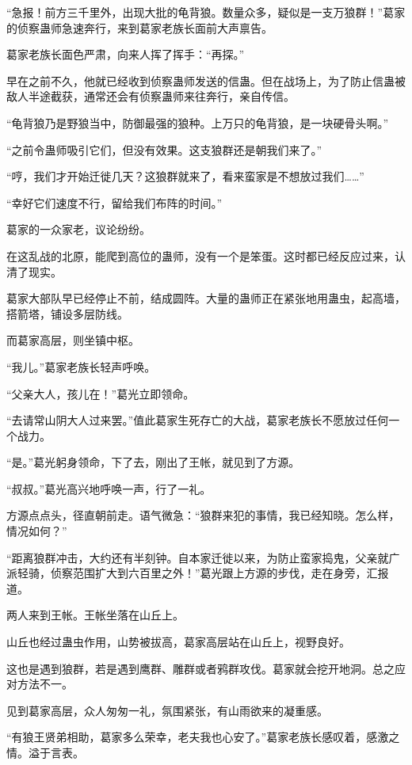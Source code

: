 
\begin{this_body}

“急报！前方三千里外，出现大批的龟背狼。数量众多，疑似是一支万狼群！”葛家的侦察蛊师急速奔行，来到葛家老族长面前大声禀告。

葛家老族长面色严肃，向来人挥了挥手：“再探。”

早在之前不久，他就已经收到侦察蛊师发送的信蛊。但在战场上，为了防止信蛊被敌人半途截获，通常还会有侦察蛊师来往奔行，亲自传信。

“龟背狼乃是野狼当中，防御最强的狼种。上万只的龟背狼，是一块硬骨头啊。”

“之前令蛊师吸引它们，但没有效果。这支狼群还是朝我们来了。”

“哼，我们才开始迁徙几天？这狼群就来了，看来蛮家是不想放过我们……”

“幸好它们速度不行，留给我们布阵的时间。”

葛家的一众家老，议论纷纷。

在这乱战的北原，能爬到高位的蛊师，没有一个是笨蛋。这时都已经反应过来，认清了现实。

葛家大部队早已经停止不前，结成圆阵。大量的蛊师正在紧张地用蛊虫，起高墙，搭箭塔，铺设多层防线。

而葛家高层，则坐镇中枢。

“我儿。”葛家老族长轻声呼唤。

“父亲大人，孩儿在！”葛光立即领命。

“去请常山阴大人过来罢。”值此葛家生死存亡的大战，葛家老族长不愿放过任何一个战力。

“是。”葛光躬身领命，下了去，刚出了王帐，就见到了方源。

“叔叔。”葛光高兴地呼唤一声，行了一礼。

方源点点头，径直朝前走。语气微急：“狼群来犯的事情，我已经知晓。怎么样，情况如何？”

“距离狼群冲击，大约还有半刻钟。自本家迁徙以来，为防止蛮家捣鬼，父亲就广派轻骑，侦察范围扩大到六百里之外！”葛光跟上方源的步伐，走在身旁，汇报道。

两人来到王帐。王帐坐落在山丘上。

山丘也经过蛊虫作用，山势被拔高，葛家高层站在山丘上，视野良好。

这也是遇到狼群，若是遇到鹰群、雕群或者鸦群攻伐。葛家就会挖开地洞。总之应对方法不一。

见到葛家高层，众人匆匆一礼，氛围紧张，有山雨欲来的凝重感。

“有狼王贤弟相助，葛家多么荣幸，老夫我也心安了。”葛家老族长感叹着，感激之情。溢于言表。


\end{this_body}
